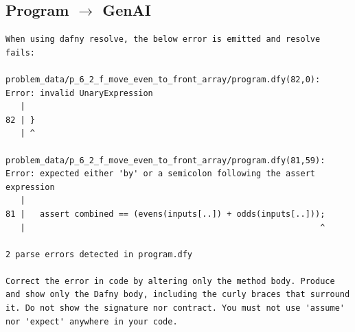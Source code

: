 \documentclass{article}
\begin{document}
\subsection*{Program $\rightarrow$ GenAI}
\begin{lstlisting}
When using dafny resolve, the below error is emitted and resolve fails:

problem_data/p_6_2_f_move_even_to_front_array/program.dfy(82,0): Error: invalid UnaryExpression
   |
82 | }
   | ^

problem_data/p_6_2_f_move_even_to_front_array/program.dfy(81,59): Error: expected either 'by' or a semicolon following the assert expression
   |
81 |   assert combined == (evens(inputs[..]) + odds(inputs[..]));
   |                                                            ^

2 parse errors detected in program.dfy

Correct the error in code by altering only the method body. Produce and show only the Dafny body, including the curly braces that surround it. Do not show the signature nor contract. You must not use 'assume' nor 'expect' anywhere in your code.
\end{lstlisting}
\end{document}
